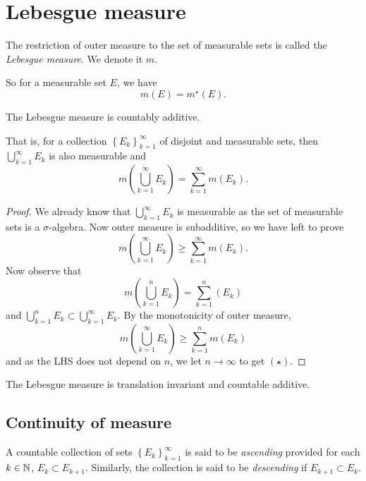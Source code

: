 \section{Lebesgue measure}

\begin{definition}
	The restriction of outer measure to the set of measurable sets is called the
	\emph{Lebesgue measure}.
	We denote it $m$.
\end{definition}

So for a measurable set $E$, we have
\[
	m(E) = m^\star(E).
\]

\begin{proposition}[]
	The Lebesgue measure is countably additive.
\end{proposition}

That is, for a collection
$
	\left\{
		E_k
	\right\}_{k=1}^\infty
$
of disjoint and measurable sets, then
$
	\bigcup_{k=1}^\infty E_k
$
is also measurable and
\[
	m\left( 
		\bigcup_{k=1}^\infty E_k 
	\right)
	= \sum^{\infty}_{k=1} m(E_k).
\]

\begin{proof}
	We already know that
	$
		\bigcup_{k=1}^\infty E_k
	$
	is measurable as the set of measurable sets is a $\sigma$-algebra.
	Now outer measure is subadditive, so we have left to prove
	\[
		m\left( 
			\bigcup_{k=1}^\infty E_k 
		\right) \geq \sum^{\infty}_{k=1} m(E_k). \tag{$\star$}
	\]
	Now observe that
	\[
		m\left( 
			\bigcup_{k=1}^n E_k 
		\right) = \sum^{n}_{k=1} (E_k)
	\]
	and
	$
		\bigcup_{k=1}^n E_k \subset \bigcup_{k=1}^\infty E_k 
	$.
	By the monotonicity of outer measure,
	\[
		m\left( 
			\bigcup_{k=1}^\infty E_k 
		\right) \geq \sum^{n}_{k=1} m(E_k)
	\]
	and as the LHS does not depend on $n$, we let $n \to \infty$ to get
	$(\star)$.
\end{proof}

\begin{theorem}[]
	The Lebesgue measure is translation invariant and countable additive.
\end{theorem}

\subsection{Continuity of measure}

\begin{definition}[]
	A countable collection of sets
	$
		\left\{
			E_k
		\right\}_{k=1}^\infty
	$
	is said to be \emph{ascending} provided for each $k \in \mathbb{N}$,
	$E_k \subset E_{k+1}$.
	Similarly, the collection is said to be \emph{descending} if 
	$E_{k+1} \subset E_k$.
\end{definition}

